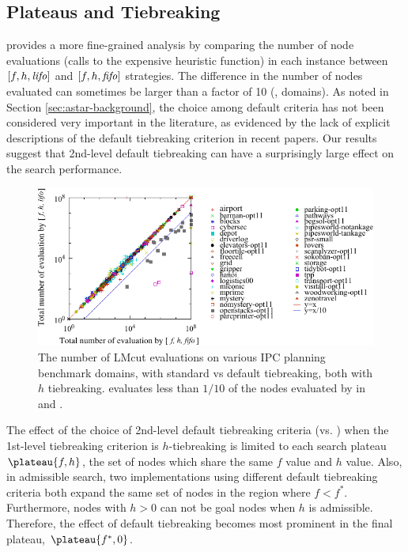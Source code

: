 \subsection{Plateaus and Tiebreaking}

 provides a
more fine-grained analysis by comparing the number of node evaluations
(calls to the expensive \lmcut heuristic function) in each instance between $[f,h,{\text{\textit{lifo}}}]$ and $[f,h,{\text{\textit{fifo}}}]$ strategies.
The difference in the number of nodes
evaluated can sometimes be larger than a factor of 10 (,  domains).
As noted in Section \ref{sec:astar-background}, the choice among default criteria has not been considered very important in the literature, as evidenced by the lack of explicit descriptions of the default tiebreaking criterion in recent papers. 
Our results suggest that 2nd-level default tiebreaking can have a surprisingly large effect on
the search performance.

\begin{figure}[htbp]
 \centering {}
 \includegraphics[width=\linewidth]{tables/aaai16-30min-5min-cut/aaai16prelim3/evaluated-lmcut_ff-lmcut_lf.pdf}
 \caption{The number of LMcut evaluations on various IPC planning benchmark domains,
 with standard \fifo vs \lifo default tiebreaking, both with $h$
 tiebreaking. \lifo evaluates  less than $1/10$ of the nodes evaluated
 by \fifo in  and . 
 }
 \label{fig:f-h-eval}
\end{figure}

The effect of the choice of 2nd-level default tiebreaking criteria (\lifo vs.
\fifo)  when the 1st-level tiebreaking criterion is  $h$-tiebreaking is
limited to each search plateau $\plateau{f,h}$, the set of nodes which
share the same $f$ value and $h$ value.
% 
Also, in admissible search, two \astar implementations using 
different default tiebreaking criteria both expand the same set of
nodes in the region where $f<f^*$.
% 
Furthermore, nodes with $h>0$ can not be goal nodes when $h$ is admissible.
% 
Therefore, the effect of default tiebreaking becomes most prominent in the final plateau, $\plateau{f^*,0}$.

